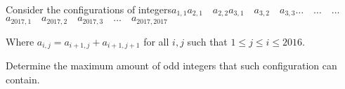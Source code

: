 Consider the configurations of integers$a_{1,1}$$a_{2,1} \quad a_{2,2}$$a_{3,1} \quad a_{3,2} \quad a_{3,3}$$\dots \quad \dots \quad \dots$$a_{2017,1} \quad a_{2017,2} \quad a_{2017,3} \quad \dots \quad a_{2017,2017}$

Where $a_{i,j} = a_{i+1,j} + a_{i+1,j+1}$ for all $i,j$ such that $1 \leq j \leq i \leq 2016$.

Determine the maximum amount of odd integers that such configuration can contain.